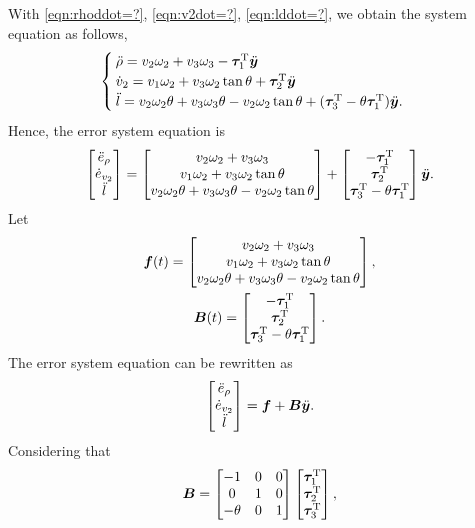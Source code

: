 \documentclass[5p,authoryear,preprint]{elsarticle}\linenofalse
\begin{document}
With \eqref{eqn:rhoddot=?}, \eqref{eqn:v2dot=?}, \eqref{eqn:lddot=?},
we obtain the system equation as follows,
\[\begin{cases}
	\ddot{\rho}=v_2\omega_2+v_3\omega_3-\bm{\tau}_1^\mathrm{T}\ddot{\bm{y}}\\
	\dot{v}_2=v_1\omega_2+v_3\omega_2\tan\theta+\bm{\tau}_2^\mathrm{T}\ddot{\bm{y}}\\
	\ddot{l}=v_2\omega_2\theta+v_3\omega_3\theta-v_2\omega_2\tan\theta+(\bm{\tau}_3^\mathrm{T}-\theta\bm{\tau}_1^\mathrm{T})\ddot{\bm{y}}.
\end{cases}\]
Hence, the error system equation is
\[
\begin{bmatrix}\ddot{e}_\rho\\ \dot{e}_{v_2}\\ \ddot{l}\end{bmatrix}
=\begin{bmatrix}
	v_2\omega_2+v_3\omega_3\\
	v_1\omega_2+v_3\omega_2\tan\theta\\
	v_2\omega_2\theta+v_3\omega_3\theta-v_2\omega_2\tan\theta
\end{bmatrix}+
\begin{bmatrix}-\bm{\tau}_1^\mathrm{T}\\ \bm{\tau}_2^\mathrm{T}\\ \bm{\tau}_3^\mathrm{T}-\theta\bm{\tau}_1^\mathrm{T}\end{bmatrix}\ddot{\bm{y}}.
\]
Let
\begin{gather*}
	\bm f(t)=\begin{bmatrix}
		v_2\omega_2+v_3\omega_3\\
		v_1\omega_2+v_3\omega_2\tan\theta\\
		v_2\omega_2\theta+v_3\omega_3\theta-v_2\omega_2\tan\theta
	\end{bmatrix},\\
	\bm B(t)=\begin{bmatrix}-\bm{\tau}_1^\mathrm{T}\\ \bm{\tau}_2^\mathrm{T}\\ \bm{\tau}_3^\mathrm{T}-\theta\bm{\tau}_1^\mathrm{T}\end{bmatrix}.
\end{gather*}
The error system equation can be rewritten as
\begin{equation}\label{eqn:error system}
	\begin{bmatrix}\ddot{e}_\rho\\ \dot{e}_{v_2}\\ \ddot{l}\end{bmatrix}=\bm f+\bm B\ddot{\bm{y}}.
\end{equation}
Considering that
\[
\bm B=\begin{bmatrix}-1&0&0\\ 0&1&0\\ -\theta&0&1\end{bmatrix}
\begin{bmatrix}\bm{\tau}_1^\mathrm{T}\\ \bm{\tau}_2^\mathrm{T}\\ \bm{\tau}_3^\mathrm{T}\end{bmatrix},
\]
\end{document}
